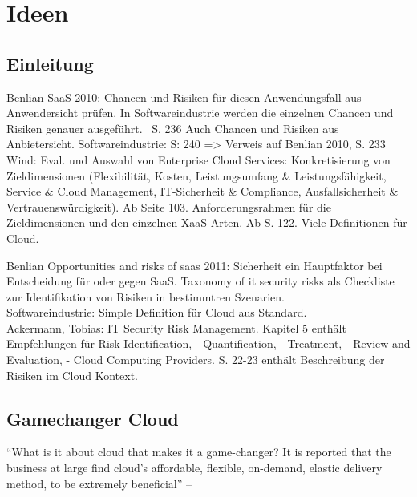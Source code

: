 \section{Ideen}
\subsection{Einleitung}
Benlian SaaS 2010: Chancen und Risiken für diesen Anwendungsfall aus Anwendersicht prüfen. In Softwareindustrie werden die einzelnen Chancen und Risiken genauer ausgeführt. ~S. 236
Auch Chancen und Risiken aus Anbietersicht. Softwareindustrie: S: 240 => Verweis auf Benlian 2010, S. 233 \\
Wind: Eval. und Auswahl von Enterprise Cloud Services: Konkretisierung von Zieldimensionen (Flexibilität, Kosten, Leistungsumfang  \& Leistungsfähigkeit, Service \& Cloud Management, IT-Sicherheit \&
Compliance, Ausfallsicherheit \& Vertrauenswürdigkeit). Ab Seite 103. Anforderungsrahmen für die Zieldimensionen und den einzelnen XaaS-Arten. Ab S. 122. Viele Definitionen für Cloud.

Benlian Opportunities and risks of saas 2011: Sicherheit ein Hauptfaktor bei Entscheidung für oder gegen SaaS. Taxonomy of it security risks als Checkliste zur Identifikation von Risiken in bestimmtren
Szenarien. \\

Softwareindustrie: Simple Definition für Cloud aus Standard. \\

Ackermann, Tobias: IT Security Risk Management. Kapitel 5 enthält Empfehlungen für Risk Identification, - Quantification, - Treatment, - Review and Evaluation, - Cloud Computing Providers. S. 22-23 enthält
Beschreibung der Risiken im Cloud Kontext.


\subsection{Gamechanger Cloud}
"`What is it about cloud that makes it a game-changer? It
is reported that the business at large find cloud’s affordable,
flexible, on-demand, elastic delivery method, to be extremely
beneficial"'
-- 



